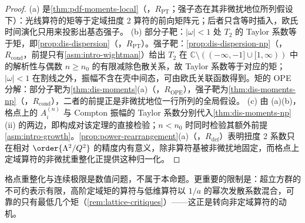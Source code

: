 \begin{proof}
(a) 是\cref{thm:pdf-moments-local}（\tagR，$R_{\mathrm{PT}}$；强子态在其非微扰地位所列假设下）：光线算符的矩等于定域扭度 2 算符的前向矩阵元；后者只含等时插入，欧氏时间演化只用来投影出基态强子。
(b) 部分子靶：$|\omega|<1$ 处 $T_2$ 的 Taylor 系数等于矩，即\cref{prop:dis-dispersion}（\tagR，$R_{\mathrm{PT}}$）。强子靶：\cref{prop:dis-dispersion-np}（\tagR，$R_{\mathrm{cond}}$，前提只有\cref{asm:intro-wightman}）给出 $T_2$ 在 $\mathbb C\setminus((-\infty,-1]\cup[1,\infty))$ 中的解析性与偶数 $n\ge n_0$ 的有限减除色散关系，故 Taylor 系数等于对应的矩；$|\omega|<1$ 在割线之外，振幅不含在壳中间态，可由欧氏关联函数得到。矩的 OPE 分解：部分子靶为\cref{thm:dis-moments}(a)（\tagR，$R_{\mathrm{OPE}}$），强子靶为\cref{thm:dis-moments-np}（\tagR，$R_{\mathrm{cond}}$），二者的前提正是非微扰地位一行所列的全局假设。
(c) 由 (a)(b)，格点上的 $A^{(n)}_i$ 与 Compton 振幅的 Taylor 系数分别代入\cref{thm:dis-moments-np}(ii) 的两边，即构成对该定理的直接检验；$n<n_0$ 时同时检验其额外前提\cref{asm:intro-growth}。\cref{prop:power-rearrangement}(a)（\tagR，$R_{\mathrm{def}}$）表明扭度 2 系数只在相对 $\order{\Lambda^2/Q^2}$ 的精度内有意义，除非算符基被非微扰地固定，而格点上定域算符的非微扰重整化正提供这种归一化。
\end{proof}

格点重整化与连续极限是数值问题，不属于本命题。更重要的限制是：超立方群的不可约表示有限，高阶定域矩的算符与低维算符以 $1/a$ 的幂次发散系数混合，可靠的只有最低几个矩（\cref{rem:lattice-critiques}）——这正是转向非定域算符的动机。

